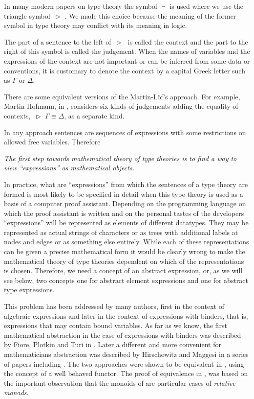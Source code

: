 \documentclass[12pt]{amsart}
\newcommand{\rh}{{\,\rhd\,\,}}
\begin{document}
In many modern papers on type theory the symbol $\vdash$ is used where we use the triangle symbol $\rh$. We made this choice because the meaning of the former symbol in type theory may conflict with its meaning in logic. 

The part of a sentence to the left of $\rh$ is called the context and the part to the right of this symbol is called the judgement. When the names of variables and the expressions of the context are not important or can be inferred from some data or conventions, it is customary to denote the context by a capital Greek letter such as $\Gamma$ or $\Delta$. 

There are some equivalent versions of the Martin-L\"{o}f's approach. For example, Martin Hofmann, in \cite{Hofmann}, considers six kinds of judgements adding the equality of contexts, $\rh \Gamma\equiv\Delta$, as a separate kind. 

In any approach sentences are sequences of expressions with some restrictions on allowed free variables. Therefore

{\em The first step towards mathematical theory of type theories is to find a way to view ``expressions'' as mathematical objects.}

In practice, what are ``expressions'' from which the sentences of a type theory are formed is most likely to be specified in detail when this type theory is used as a basis of a computer proof assistant. Depending on the programming language on which the proof assistant is written and on the personal tastes of the developers ``expressions'' will be represented as elements of different datatypes. They may be represented as actual strings of characters or as trees with additional labels at nodes and edges or as something else entirely. While each of these representations can be given a precise mathematical form it would be clearly wrong to make the mathematical theory of type theories dependent on which of the representations is chosen. Therefore, we need a concept of an abstract expression, or, as we will see below, two concepts one for abstract element expressions and one for abstract type expressions.

This problem has been addressed by many authors, first in the context of algebraic expressions and later in the context of expressions with binders, that is, expressions that may contain bound variables. As far as we know, the first mathematical abstraction in the case of expressions with binders was described by Fiore, Plotkin and Turi in \cite{FPT}. Later a different and more convenient for mathematicians abstraction was described by Hirschowitz and Maggesi in a series of papers including \cite{HM2010}. 
The two approaches were shown to be equivalent in \cite{ACU}, \cite{ACU2} using the concept of a well behaved functor. 
The proof of equivalence in \cite{ACU}, \cite{ACU2} was based on the important observation that the monoids of \cite{FPT} are particular cases of {\em relative monads}. 
\end{document}
